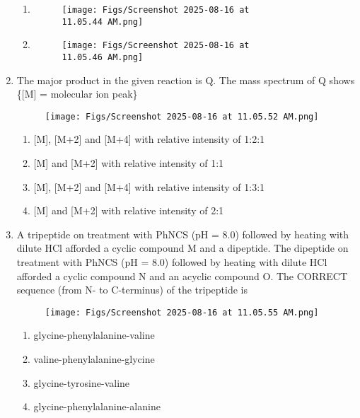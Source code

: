 \documentclass[12pt]{article}
\begin{document}
\begin{enumerate}
\begin{enumerate}
\item  \begin{figure}[H]
\centering
\texttt{[image: Figs/Screenshot 2025-08-16 at 11.05.44 AM.png]}
\caption{}
\end{figure}

\item  
\begin{figure}[H]
\centering
\texttt{[image: Figs/Screenshot 2025-08-16 at 11.05.46 AM.png]}
\caption{}
\end{figure}
\end{enumerate}


\item The major product in the given reaction is Q. The mass spectrum of Q shows
\{[M] = molecular ion peak\}
\begin{figure}[H]
\centering
\texttt{[image: Figs/Screenshot 2025-08-16 at 11.05.52 AM.png]}
\caption{}
\end{figure}

\begin{enumerate}

    \item {[M], [M+2] and [M+4] with relative intensity of 1:2:1 }
    \item {[M] and [M+2] with relative intensity of 1:1}
    \item {[M], [M+2] and [M+4] with relative intensity of 1:3:1}
    \item {[M] and [M+2] with relative intensity of 2:1}
    
\end{enumerate}

\item A tripeptide on treatment with PhNCS (pH = 8.0) followed by heating with dilute
HCl afforded a cyclic compound M and a dipeptide. The dipeptide on treatment
with PhNCS (pH = 8.0) followed by heating with dilute HCl afforded a cyclic
compound N and an acyclic compound O. The CORRECT sequence (from N- to
C-terminus) of the tripeptide is

\begin{figure}[H]
\centering
\texttt{[image: Figs/Screenshot 2025-08-16 at 11.05.55 AM.png]}
\caption{}
\end{figure}


\begin{enumerate}
    \item glycine-phenylalanine-valine
    \item valine-phenylalanine-glycine
    \item glycine-tyrosine-valine
    \item glycine-phenylalanine-alanine
\end{enumerate}




\end{enumerate}
\end{document}
